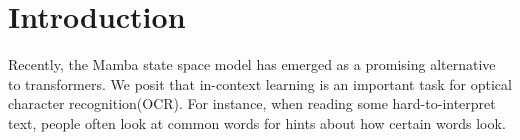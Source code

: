 \section{Introduction}
Recently, the Mamba state space model has emerged as a promising alternative to
transformers\cite{mamba}. 
We posit that in-context learning is an important task for optical character
recognition(OCR).
For instance, when reading some hard-to-interpret text, people often look at
common words for hints about how certain words look.


